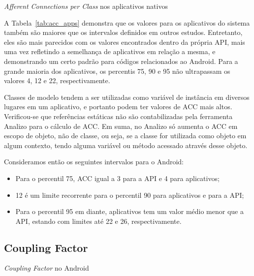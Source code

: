 \begin{table}[!htb]
\centering
{}

\caption{\textit{Afferent Connections per Class} nos aplicativos nativos}
\label{tab:acc_apps}
\end{table}

A Tabela~\ref{tab:acc_apps} demonstra que os valores para os aplicativos do sistema também são maiores que os intervalos definidos em outros estudos. Entretanto, eles são mais parecidos com os valores encontrados dentro da própria API, mais uma vez refletindo a semelhança de aplicativos em relação a mesma, e demonstrando um certo padrão para códigos relacionados ao Android. Para a grande maioria dos aplicativos, os percentis 75, 90 e 95 não ultrapassam os valores 4, 12 e 22, respectivamente.

Classes de modelo tendem a ser utilizadas como variável de instância em diversos lugares em um aplicativo, e portanto podem ter valores de ACC mais altos. Verificou-se que referências estáticas não são contabilizadas pela ferramenta Analizo para o cálculo de ACC. Em suma, no Analizo só aumenta o ACC em escopo de objeto, não de classe, ou seja, se a classe for utilizada como objeto em algum contexto, tendo alguma variável ou método acessado através desse objeto.

Consideramos então os seguintes intervalos para o Android:

\begin{itemize}
\item Para o percentil 75, ACC igual a 3 para a API e 4 para aplicativos;
\item 12 é um limite recorrente para o percentil 90 para aplicativos e para a API;
\item Para o percentil 95 em diante, aplicativos tem um valor médio menor que a API, estando com limites até 22 e 26, respectivamente.
\end{itemize}

\subsection{Coupling Factor}

\begin{table}[!htb]
\centering
{}

\caption{\textit{Coupling Factor} no Android}
\label{tab:cof_android}
\end{table}

